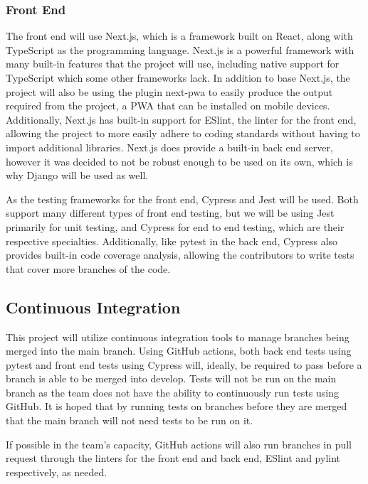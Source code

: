 \documentclass{article}
\begin{document}
\subsubsection{Front End}

The front end will use Next.js, which is a framework built on React, along with TypeScript as the programming language. Next.js is a powerful framework with many built-in features that the project will use, including native support for TypeScript which some other frameworks lack. In addition to base Next.js, the project will also be using the plugin next-pwa to easily produce the output required from the project, a PWA that can be installed on mobile devices. Additionally, Next.js has built-in support for ESlint, the linter for the front end, allowing the project to more easily adhere to coding standards without having to import additional libraries. Next.js does provide a built-in back end server, however it was decided to not be robust enough to be used on its own, which is why Django will be used as well.

As the testing frameworks for the front end, Cypress and Jest will be used. Both support many different types of front end testing, but we will be using Jest primarily for unit testing, and Cypress for end to end testing, which are their respective specialties. Additionally, like pytest in the back end, Cypress also provides built-in code coverage analysis, allowing the contributors to write tests that cover more branches of the code. 

\subsection{Continuous Integration}

This project will utilize continuous integration tools to manage branches being merged into the main branch. Using GitHub actions, both back end tests using pytest and front end tests using Cypress will, ideally, be required to pass before a branch is able to be merged into develop. Tests will not be run on the main branch as the team does not have the ability to continuously run tests using GitHub. It is hoped that by running tests on branches before they are merged that the main branch will not need tests to be run on it.

If possible in the team's capacity, GitHub actions will also run branches in pull request through the linters for the front end and back end, ESlint and pylint respectively, as needed.
\end{document}
